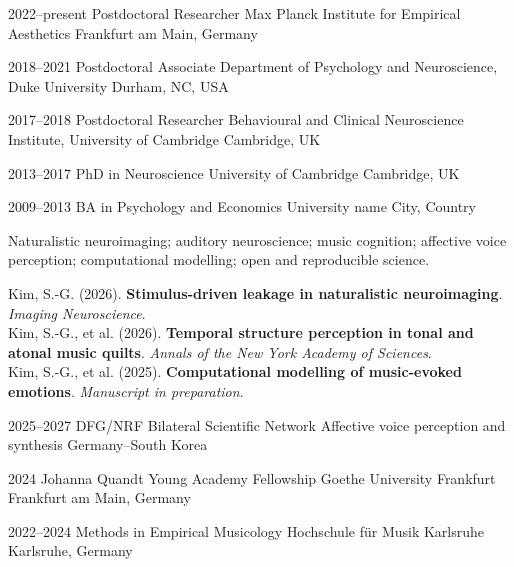 \documentclass[a4paper,11pt]{article}
\institute{Max Planck Institute for Empirical Aesthetics}
\begin{document}
\makecvheader


\cventry
  {2022--present}
  {Postdoctoral Researcher}
  {Max Planck Institute for Empirical Aesthetics}
  {Frankfurt am Main, Germany}

\cventry
  {2018--2021}
  {Postdoctoral Associate}
  {Department of Psychology and Neuroscience, Duke University}
  {Durham, NC, USA}

\cventry
  {2017--2018}
  {Postdoctoral Researcher}
  {Behavioural and Clinical Neuroscience Institute, University of Cambridge}
  {Cambridge, UK}


\cventry
  {2013--2017}
  {PhD in Neuroscience}
  {University of Cambridge}
  {Cambridge, UK}

\cventry
  {2009--2013}
  {BA in Psychology and Economics}
  {University name}
  {City, Country}


Naturalistic neuroimaging; auditory neuroscience; music cognition; affective voice perception; computational modelling; open and reproducible science.


\noindent
Kim, S.-G. (2026). \textbf{Stimulus-driven leakage in naturalistic neuroimaging}. \emph{Imaging Neuroscience}.\\[0.5\baselineskip]

\noindent
Kim, S.-G., et al. (2026). \textbf{Temporal structure perception in tonal and atonal music quilts}. \emph{Annals of the New York Academy of Sciences}.\\[0.5\baselineskip]

\noindent
Kim, S.-G., et al. (2025). \textbf{Computational modelling of music-evoked emotions}. \emph{Manuscript in preparation}.\\[0.5\baselineskip]


\cventry
  {2025--2027}
  {DFG/NRF Bilateral Scientific Network}
  {Affective voice perception and synthesis}
  {Germany--South Korea}

\cventry
  {2024}
  {Johanna Quandt Young Academy Fellowship}
  {Goethe University Frankfurt}
  {Frankfurt am Main, Germany}


\cventry
  {2022--2024}
  {Methods in Empirical Musicology}
  {Hochschule f\"ur Musik Karlsruhe}
  {Karlsruhe, Germany}
\end{document}

